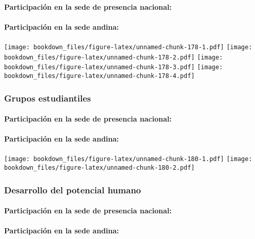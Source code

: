 \documentclass[]{article}
\let\oldparagraph\paragraph
\renewcommand{\paragraph}[1]{\oldparagraph{#1}\mbox{}}
\theoremstyle{definition}
\theoremstyle{definition}
\theoremstyle{definition}
\theoremstyle{remark}
\begin{document}
\paragraph{Participación en la sede de presencia
nacional:}\label{participacion-en-la-sede-de-presencia-nacional-5}

\paragraph{Participación en la sede
andina:}\label{participacion-en-la-sede-andina-5}

\texttt{[image: bookdown\_files/figure-latex/unnamed-chunk-178-1.pdf]}
\texttt{[image: bookdown\_files/figure-latex/unnamed-chunk-178-2.pdf]}
\texttt{[image: bookdown\_files/figure-latex/unnamed-chunk-178-3.pdf]}
\texttt{[image: bookdown\_files/figure-latex/unnamed-chunk-178-4.pdf]}

\subsubsection{Grupos estudiantiles}\label{grupos-estudiantiles-1}

\paragraph{Participación en la sede de presencia
nacional:}\label{participacion-en-la-sede-de-presencia-nacional-6}

\paragraph{Participación en la sede
andina:}\label{participacion-en-la-sede-andina-6}

\texttt{[image: bookdown\_files/figure-latex/unnamed-chunk-180-1.pdf]}
\texttt{[image: bookdown\_files/figure-latex/unnamed-chunk-180-2.pdf]}

\subsubsection{Desarrollo del potencial
humano}\label{desarrollo-del-potencial-humano-1}

\paragraph{Participación en la sede de presencia
nacional:}\label{participacion-en-la-sede-de-presencia-nacional-7}

\paragraph{Participación en la sede
andina:}\label{participacion-en-la-sede-andina-7}
\end{document}
